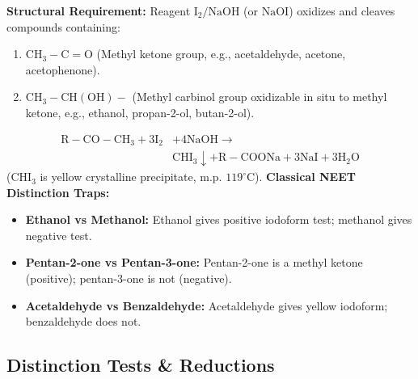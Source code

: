\documentclass[10pt,twoside,openright]{book}
\begin{document}
\begin{trapbox}
\textbf{Structural Requirement:} Reagent $\mathrm{I_2 / NaOH}$ (or $\mathrm{NaOI}$) oxidizes and cleaves compounds containing:
\begin{enumerate}
  \item $\mathrm{CH_3-C=O}$ (Methyl ketone group, e.g., acetaldehyde, acetone, acetophenone).
  \item $\mathrm{CH_3-CH(OH)}-$ (Methyl carbinol group oxidizable in situ to methyl ketone, e.g., ethanol, propan-2-ol, butan-2-ol).
\end{enumerate}
\begin{align}
  \mathrm{R-CO-CH_3} + 3\mathrm{I_2} &+ 4\mathrm{NaOH} \longrightarrow \\
  &\mathbf{\mathrm{CHI_3}}\downarrow + \mathrm{R-COONa} + 3\mathrm{NaI} + 3\mathrm{H_2O}
\end{align}
($\mathrm{CHI_3}$ is yellow crystalline precipitate, m.p. $119^\circ\text{C}$).
\textbf{Classical NEET Distinction Traps:}
\begin{itemize}
  \item \textbf{Ethanol vs Methanol:} Ethanol gives positive iodoform test; methanol gives negative test.
  \item \textbf{Pentan-2-one vs Pentan-3-one:} Pentan-2-one is a methyl ketone (positive); pentan-3-one is not (negative).
  \item \textbf{Acetaldehyde vs Benzaldehyde:} Acetaldehyde gives yellow iodoform; benzaldehyde does not.
\end{itemize}
\end{trapbox}

\subsection{Distinction Tests \& Reductions}
\end{document}
